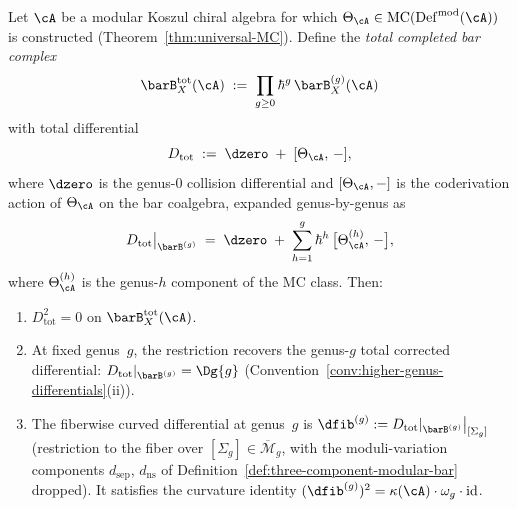 \begin{theorem}\label{thm:total-differential-from-mc}
Let $\cA$ be a modular Koszul chiral algebra for which
$\Theta_\cA \in
\operatorname{MC}(\operatorname{Def}^{\mathrm{mod}}(\cA))$
is constructed
\textup{(}Theorem~\textup{\ref{thm:universal-MC})}.
Define the \emph{total completed bar complex}
\begin{equation}\label{eq:completed-bar-total}
\barB^{\mathrm{tot}}_X(\cA)
\;:=\;
\prod_{g \geq 0} \hbar^{g}\,
\barB_X^{(g)}(\cA)
\end{equation}
with total differential
\begin{equation}\label{eq:D-total-from-theta}
D_{\mathrm{tot}}
\;:=\;
\dzero \;+\; [\Theta_\cA,\, -],
\end{equation}
where $\dzero$ is the genus-$0$ collision differential and
$[\Theta_\cA, -]$ is the coderivation action of $\Theta_\cA$ on
the bar coalgebra, expanded genus-by-genus as
\begin{equation}\label{eq:D-total-expanded}
D_{\mathrm{tot}}\big|_{\barB^{(g)}}
\;=\;
\dzero \;+\;
\sum_{h=1}^{g} \hbar^{h}\,
\bigl[\Theta_\cA^{(h)},\, -\bigr],
\end{equation}
where $\Theta_\cA^{(h)}$ is the genus-$h$ component of the MC
class.
Then:
\begin{enumerate}[label=\textup{(\roman*)}]
\item $D_{\mathrm{tot}}^2 = 0$ on
 $\barB^{\mathrm{tot}}_X(\cA)$.
\item At fixed genus~$g$, the restriction recovers the
 genus-$g$ total corrected differential:
 $D_{\mathrm{tot}}|_{\barB^{(g)}} = \Dg{g}$
 \textup{(}Convention~\textup{\ref{conv:higher-genus-differentials}(ii))}.
\item The fiberwise curved differential at genus~$g$ is
 $\dfib^{(g)} := D_{\mathrm{tot}}|_{\barB^{(g)}}
 \big|_{[\Sigma_g]}$
 (restriction to the fiber over $[\Sigma_g] \in
 \overline{\mathcal{M}}_g$, with the moduli-variation components
 $d_{\mathrm{sep}}$, $d_{\mathrm{ns}}$ of
 Definition~\textup{\ref{def:three-component-modular-bar}}
 dropped). It satisfies the curvature identity
 $(\dfib^{(g)})^2 = \kappa(\cA) \cdot \omega_g \cdot
 \operatorname{id}$.
\end{enumerate}
\end{theorem}

